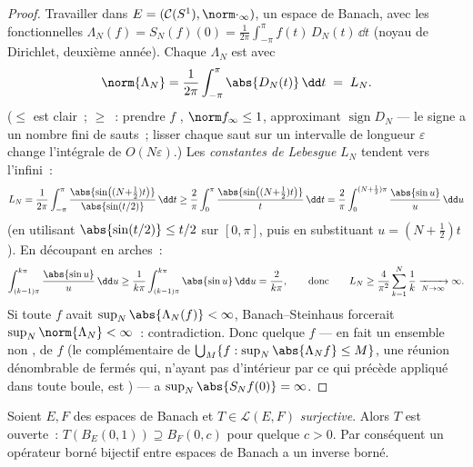\begin{proof}
Travailler dans $E = (\mathcal C(S^1), \norm\cdot_\infty)$, un
espace de Banach, avec les fonctionnelles $\Lambda_N(f) =
S_N(f)(0) = \frac1{2\pi}\int_{-\pi}^{\pi}f(t)\,D_N(t)\,\dd t$
(noyau de Dirichlet, deuxième année). Chaque $\Lambda_N$ est
 avec
\[
\norm{\Lambda_N} = \frac1{2\pi}\int_{-\pi}^\pi\abs{D_N(t)}\,\dd
t \;=\; L_N .
\]
($\leq$ est clair~; $\geq$~: prendre $f$ , $\norm
f_\infty \leq 1$, approximant $\operatorname{sign}D_N$ --- le
signe a un nombre fini de sauts~; lisser chaque saut sur un
intervalle de longueur $\varepsilon$ change l'intégrale de
$O(N\varepsilon)$.) Les \emph{constantes de Lebesgue} $L_N$
tendent vers l'infini~:
\[
L_N = \frac1{2\pi}\int_{-\pi}^{\pi}
\frac{\abs{\sin\bigl((N{+}\tfrac12)t\bigr)}}{\abs{\sin(t/2)}}
\,\dd t
\geq \frac{2}{\pi}\int_0^{\pi}
\frac{\abs{\sin\bigl((N{+}\tfrac12)t\bigr)}}{t}\,\dd t
= \frac{2}{\pi}\int_0^{(N+\frac12)\pi}\frac{\abs{\sin
u}}{u}\,\dd u
\]
(en utilisant $\abs{\sin(t/2)} \leq t/2$ sur $[0, \pi]$, puis
en substituant $u = (N + \tfrac12)t$). En découpant en
arches~:
\[
\int_{(k-1)\pi}^{k\pi}\frac{\abs{\sin u}}u\,\dd u
\geq \frac1{k\pi}\int_{(k-1)\pi}^{k\pi}\abs{\sin u}\,\dd u =
\frac{2}{k\pi},
\qquad\text{donc}\qquad
L_N \geq \frac{4}{\pi^2}\sum_{k=1}^N\frac1k
\xrightarrow[N\to\infty]{} \infty .
\]
Si toute $f$  avait $\sup_N \abs{\Lambda_N(f)} <
\infty$, Banach--Steinhaus forcerait $\sup_N\norm{\Lambda_N} <
\infty$~: contradiction. Donc quelque $f$ --- en fait un
ensemble non ,  de $f$ (le complémentaire de
$\bigcup_M\{f: \sup_N\abs{\Lambda_Nf}\leq M\}$, une réunion
dénombrable de fermés qui, n'ayant pas d'intérieur par ce qui
précède appliqué dans toute boule, est ) --- a
$\sup_N\abs{S_Nf(0)} = \infty$.
\end{proof}

\begin{theorem}\label{thm:b3:banach:openmapping}
Soient $E, F$ des espaces de Banach et $T \in \mathcal L(E,
F)$ \emph{surjective}. Alors $T$ est ouverte~: $T(B_E(0,1))
\supseteq B_F(0, c)$ pour quelque $c > 0$. Par conséquent un
opérateur borné bijectif entre espaces de Banach a un inverse
borné.
\end{theorem}

